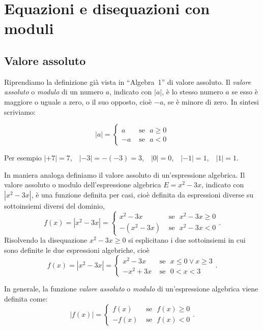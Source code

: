\chapter{Equazioni e disequazioni con moduli}

\section{Valore assoluto}
Riprendiamo la definizione già vista in ``Algebra~1'' di valore assoluto. Il \emph{valore assoluto} o \emph{modulo} di un numero $a$, indicato con $|a|$, è lo stesso numero $a$ se esso è maggiore o uguale a zero, o il suo opposto, cioè $-a$, se è minore di zero. In sintesi scriviamo:

\begin{equation*}
\left|a\right|=\begin{cases}a & \text{ se~~}a\ge 0\\
-a & \text{ se~~}a<0\end{cases}
\end{equation*}

Per esempio $\left|+7\right|=7$,~~$\left|-3\right|=-(-3)=3$,~~$\left|0\right|=0$,~~$\left|-1\right|=1$,~~$\left|1\right|=1$.

In maniera analoga definiamo il valore assoluto di un'espressione algebrica.
Il valore assoluto o modulo dell'espressione algebrica $E=x^2-3x$, indicato con $\left|x^2-3x\right|$, è una funzione definita per casi, cioè definita da espressioni diverse su sottoinsiemi diversi del dominio, 
\[f(x)=\left|x^2-3x\right|=\begin{cases}x^2-3x & \text{ se~~}x^2-3x\ge 0\\-\left(x^2-3x\right) & \text{ se~~}x^2-3x<0\end{cases}.\]
Risolvendo la disequazione $x^2-3x\ge 0$ si esplicitano i due sottoinsiemi in cui sono definite le due espressioni algebriche, cioè 
\[f(x)=\left|x^2-3x\right|=\begin{cases}x^2-3x & \text{ se~~}x\le 0\vee x\ge 3\\-x^2+3x & \text{ se~~}0<x<3\end{cases}.\]

In generale, la funzione \emph{valore assoluto} o \emph{modulo} di un'espressione algebrica viene definita come: 
\[\left|f(x)\right|=\begin{cases}f(x) & \text{ se~~}f(x)\ge 0\\-f(x) & \text{ se~~}f(x)<0\end{cases}.\]

